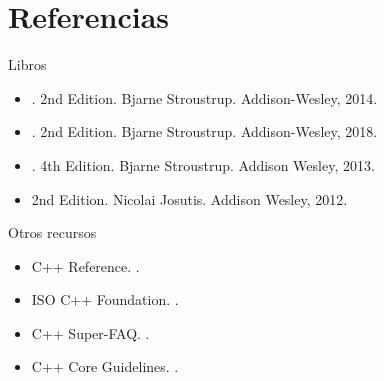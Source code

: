 \section{Referencias}

\begin{frame}[t]{Libros}
\begin{itemize}
  \item {}.
        2nd Edition.
        Bjarne Stroustrup.
        Addison-Wesley, 2014.

  \vfill
  \item {}.
        2nd Edition.
        Bjarne Stroustrup.
        Addison-Wesley, 2018.

  \vfill
  \item {}.
        4th Edition.
        Bjarne Stroustrup.
        Addison Wesley, 2013.

  \vfill
  \item {}
        2nd Edition.
        Nicolai Josutis.
        Addison Wesley, 2012.
\end{itemize}
\end{frame}

\begin{frame}[t]{Otros recursos}
\begin{itemize}
  \item C++ Reference.
        .

  \vfill
  \item ISO C++ Foundation.
        .

  \vfill
  \item C++ Super-FAQ.
        .

  \vfill
  \item C++ Core Guidelines.
        .
\end{itemize}
\end{frame}
